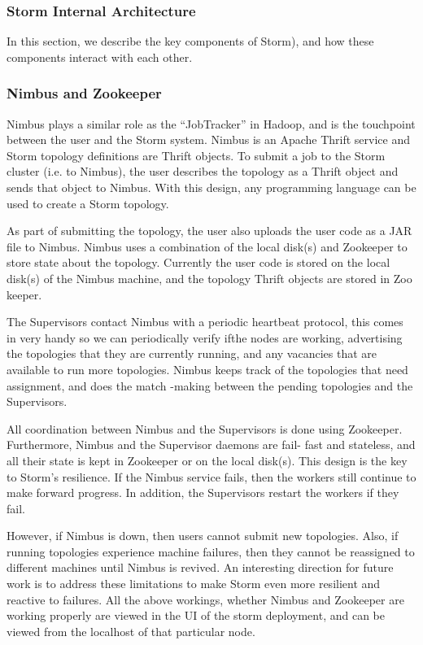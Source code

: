 \documentclass[9pt,twocolumn,twoside]{../../styles/osajnl}
\begin{document}
\subsubsection{Storm Internal Architecture}

In this section, we describe the key components of Storm), and how
these components interact with each other.

\subsubsection{Nimbus and Zookeeper}

Nimbus plays a similar role as the “JobTracker” in Hadoop, and is the
touchpoint between the user and the Storm system. Nimbus is an Apache
Thrift service and Storm topology definitions are Thrift objects.  To
submit a job to the Storm cluster (i.e. to Nimbus), the user describes
the topology as a Thrift object and sends that object to Nimbus. With
this design, any programming language can be used to create a Storm
topology.


As part of submitting the topology, the user also uploads the user
code as a JAR file to Nimbus. Nimbus uses a combination of the local
disk(s) and Zookeeper to store state about the topology. Currently the
user code is stored on the local disk(s) of the Nimbus machine, and
the topology Thrift objects are stored in Zoo keeper.


The Supervisors contact Nimbus with a periodic heartbeat protocol,
this comes in very handy so we can periodically verify ifthe nodes are
working, advertising the topologies that they are currently running,
and any vacancies that are available to run more topologies. Nimbus
keeps track of the topologies that need assignment, and does the match
-making between the pending topologies and the Supervisors.

All coordination between Nimbus and the Supervisors is done using
Zookeeper. Furthermore, Nimbus and the Supervisor daemons are fail-
fast and stateless, and all their state is kept in Zookeeper or on the
local disk(s). This design is the key to Storm’s resilience. If the
Nimbus service fails, then the workers still continue to make forward
progress. In addition, the Supervisors restart the workers if they
fail.

However, if Nimbus is down, then users cannot submit new topologies.
Also, if running topologies experience machine failures, then they
cannot be reassigned to different machines until Nimbus is revived.
An interesting direction for future work is to address these
limitations to make Storm even more resilient and reactive to
failures. All the above workings, whether Nimbus and Zookeeper are
working properly are viewed in the UI of the storm deployment, and can
be viewed from the localhost of that particular node.
\end{document}
